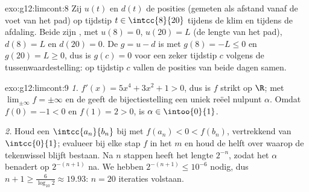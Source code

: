 \begin{solution}{exo:g12:limcont:8}
Zij $u(t)$ en $d(t)$ de posities (gemeten als afstand vanaf de voet van het
pad) op tijdstip $t \in \intcc{8}{20}$ tijdens de klim en tijdens de afdaling.
Beide zijn , met $u(8) = 0$, $u(20) = L$ (de lengte van het pad),
$d(8) = L$ en $d(20) = 0$. De  $g = u - d$ is  met
$g(8) = -L \leq 0$ en $g(20) = L \geq 0$, dus is $g(c) = 0$ voor een zeker
tijdstip $c$ volgens de tussenwaardestelling: op tijdstip $c$ vallen de
posities van beide dagen samen.
\end{solution}

\begin{solution}{exo:g12:limcont:9}
\emph{1.} $f'(x) = 5x^4 + 3x^2 + 1 > 0$, dus is $f$ strikt  op $\R$;
met $\lim_{\pm\infty} f = \pm\infty$ en de  geeft de
bijectiestelling een uniek reëel nulpunt $\alpha$. Omdat $f(0) = -1 < 0$ en
$f(1) = 2 > 0$, is $\alpha \in \intoo{0}{1}$.

\emph{2.} Houd een  $\intcc{a_n}{b_n}$ bij met
$f(a_n) < 0 < f(b_n)$, vertrekkend van $\intcc{0}{1}$; evalueer bij elke stap
$f$ in het  $m$ en houd de helft over waarop de tekenwissel blijft
bestaan. Na $n$ stappen heeft het  lengte $2^{-n}$, zodat het 
$\alpha$ benadert op $2^{-(n+1)}$ na. We hebben $2^{-(n+1)} \leq 10^{-6}$
nodig, dus $n + 1 \geq \frac{6}{\log_{10} 2} \approx 19.93$: $n = 20$
iteraties volstaan.
\end{solution}

